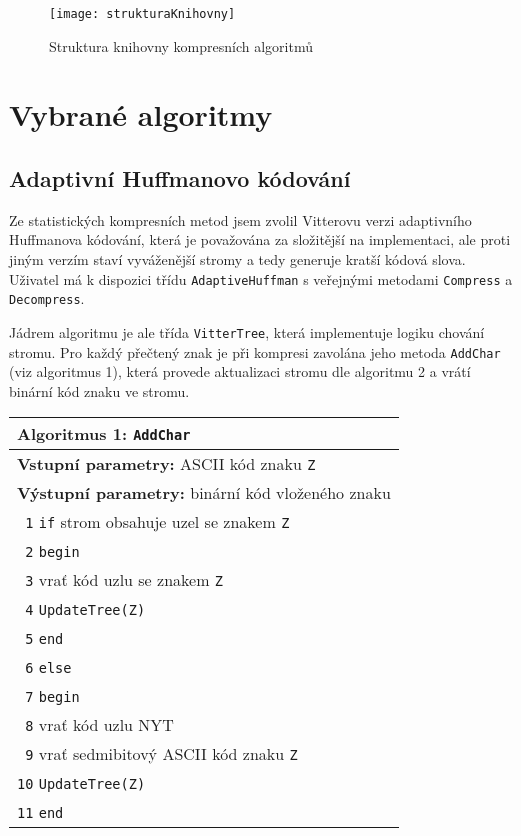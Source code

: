 \begin{figure}[!h]
\centering
\texttt{[image: strukturaKnihovny]}
\caption{Struktura knihovny kompresních algoritmů}
\label{strukturaKnihovny}
\end{figure}


\section{Vybrané algoritmy}
\subsection{Adaptivní Huffmanovo kódování}
Ze statistických kompresních metod jsem zvolil Vitterovu verzi adaptivního Huffmanova kódování, která je považována za složitější na implementaci, ale proti jiným verzím staví vyváženější stromy a tedy generuje kratší kódová slova. Uživatel má k dispozici třídu \texttt{AdaptiveHuffman} s veřejnými metodami \texttt{Compress} a \texttt{Decompress}. 

Jádrem algoritmu je ale třída \texttt{VitterTree}, která implementuje logiku chování stromu. Pro každý přečtený znak je při kompresi zavolána jeho metoda \texttt{AddChar} (viz algoritmus 1), která provede aktualizaci stromu dle algoritmu 2 a vrátí binární kód znaku ve stromu.

\begin{table}[!h]
\centering
\begin{tabular}{|l|}
\hline
\textbf{Algoritmus 1:} \texttt{AddChar}\\
\hline
\textbf{Vstupní parametry:} ASCII kód znaku \texttt{Z}\\
\textbf{Výstupní parametry:} binární kód vloženého znaku\\
\hline
\texttt{ 1} \texttt{if} strom obsahuje uzel se znakem \texttt{Z}\\
\texttt{ 2} \texttt{begin}\\
\texttt{ 3} \hspace*{5mm}vrať kód uzlu se znakem \texttt{Z}\\
\texttt{ 4} \hspace*{5mm}\texttt{UpdateTree(\texttt{Z})}\\
\texttt{ 5} \texttt{end}\\
\texttt{ 6} \texttt{else}\\
\texttt{ 7} \texttt{begin}\\
\texttt{ 8} \hspace*{5mm}vrať kód uzlu NYT\\
\texttt{ 9} \hspace*{5mm}vrať sedmibitový ASCII kód znaku \texttt{Z}\\
\texttt{10} \hspace*{5mm}\texttt{UpdateTree(\texttt{Z})}\\
\texttt{11} \texttt{end}\\
\hline
\end{tabular}
\end{table}

